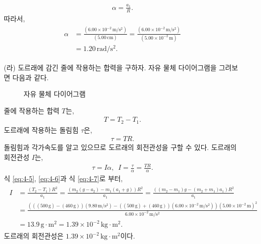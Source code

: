 \documentclass[floatfix,nofootinbib,superscriptaddress,fleqn]{revtex4-2}
\begin{document}
\begin{itemize}
\begin{align}
        \alpha=\frac{a_1}{R}.
    \end{align}
    따라서,
    \begin{align}
        \begin{split}
            \alpha&=\frac{(6.00\times 10^{-2}\,\mathrm{m/s^2})}
            {(5.00 \,\mathrm{cm})}
            = \frac{(6.00\times 10^{-2}\,\mathrm{m/s^2})}
            {(5.00\times 10^{-2} \,\mathrm{m})} \\
            &= 1.20\,\mathrm{rad/s^2}.
        \end{split}        
    \end{align}
    \item[(라)] 도르래에 감긴 줄에 작용하는 합력을 구하자. 자유 물체 다이어그램을 그려보면 다음과 같다.
    \begin{figure}[htp]
        \centering
        \caption{자유 물체 다이어그램}
    \end{figure}
    줄에 작용하는 합력 $T$는,
    \begin{align}\label{eq:4-7}
        T = T_2-T_1.
    \end{align}
    도르래에 작용하는 돌림힘 $\tau$은,
    \begin{align}
        \tau  = TR.
    \end{align}
    돌림힘과 각가속도를 알고 있으므로 도르래의 회전관성을 구할 수 있다. 도르래의 회전관성 $I$는,
    \begin{align}
        \tau = I\alpha,\,\,\, I=\frac{\tau}{\alpha}=\frac{TR}{\alpha}.
    \end{align}
    식 \eqref{eq:4-5}, \eqref{eq:4-6}과 식 \eqref{eq:4-7}로 부터,
    \begin{align}
        \begin{split}
            I &= \frac{(T_2-T_1)R^2}{a_1} =  \frac{(m_2\left( g-a_2 \right)
            -m_1\left( a_1+g \right))R^2}{a_1}  
            = \frac{((m_2-m_1)g-(m_2+m_1)a_1)R^2}{a_1} \\
            &=  \frac{(((500\,\mathrm{g})-(460\,\mathrm{g}))(9.80\,\mathrm{m/s^2})
            -((500\,\mathrm{g})+(460\,\mathrm{g}))
            (6.00\times 10^{-2}\,\mathrm{m/s^2}))(5.00\times 10^{-2}\,\mathrm{m})^2}
            {6.00\times 10^{-2}\,\mathrm{m/s^2}}    \\
            &= 13.9\,\mathrm{g\cdot m^2}=1.39\times 10^{-2}\,\mathrm{kg\cdot m^2}.
        \end{split}
    \end{align}
    도르래의 회전관성은 $1.39\times 10^{-2}\,\mathrm{kg\cdot m^2}$이다.
\end{itemize}


\vspace{1.cm}
\end{document}
